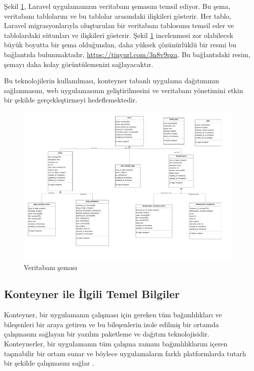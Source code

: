 Şekil \ref{fig:veritabani_diyagrami}, Laravel uygulamanızın veritabanı şemasını temsil ediyor. Bu şema, veritabanı tablolarını ve bu tablolar arasındaki ilişkileri gösterir. Her tablo, Laravel migrasyonlarıyla oluşturulan bir veritabanı tablosunu temsil eder ve tablolardaki sütunları ve ilişkileri gösterir. Şekil \ref{fig:veritabani_diyagrami} incelenmesi zor olabilecek büyük boyutta bir şema olduğundan, daha yüksek çözünürlüklü bir resmi bu bağlantıda bulunmaktadır, \href{https://tinyurl.com/3n8v9pza}{https://tinyurl.com/3n8v9pza}. Bu bağlantıdaki resim, şemayı daha kolay görüntülemenizi sağlayacaktır.

Bu teknolojilerin kullanılması, konteyner tabanlı uygulama dağıtımının sağlanmasını, web uygulamasının geliştirilmesini ve veritabanı yönetimini etkin bir şekilde gerçekleştirmeyi hedeflemektedir.
\begin{figure}[ht]
  \includegraphics[width=\linewidth]{images/exported_from_idea.drawio.pdf}
  \caption{Veritabanı şeması}
  \label{fig:veritabani_diyagrami}
  \end{figure}
\subsection{Konteyner ile İlgili Temel Bilgiler}
Konteyner, bir uygulamanın çalışması için gereken tüm bağımlılıkları ve bileşenleri bir araya getiren ve bu bileşenlerin izole edilmiş bir ortamda çalışmasını sağlayan bir yazılım paketleme ve dağıtım teknolojisidir. Konteynerler, bir uygulamanın tüm çalışma zamanı bağımlılıklarını içeren taşınabilir bir ortam sunar ve böylece uygulamaların farklı platformlarda tutarlı bir şekilde çalışmasını sağlar \cite{domenici_bravo}.

